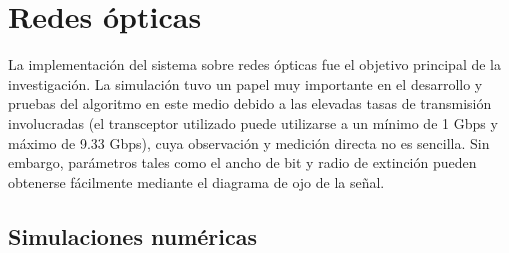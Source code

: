 

\section{Redes ópticas}
La implementación del sistema sobre redes ópticas fue el objetivo principal de la investigación.
La simulación tuvo un papel muy importante en el desarrollo y pruebas del algoritmo en este medio debido a las elevadas tasas de transmisión involucradas (el transceptor utilizado puede utilizarse a un mínimo de 1 Gbps y máximo de 9.33 Gbps), cuya observación y medición directa no es sencilla. Sin embargo, parámetros tales como el ancho de bit y radio de extinción pueden obtenerse fácilmente mediante el diagrama de ojo de la señal.

\subsection{Simulaciones numéricas}

